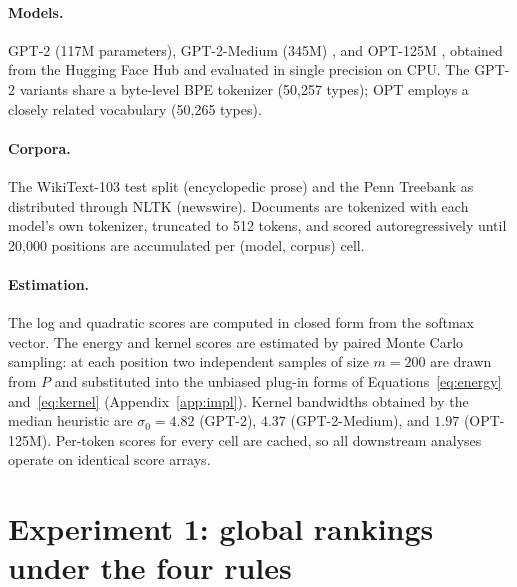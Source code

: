 \documentclass{article}
\begin{document}
\paragraph{Models.} GPT-2 (117M parameters), GPT-2-Medium (345M)
\citep{radford2019}, and OPT-125M \citep{zhang2022}, obtained from the Hugging Face Hub
and evaluated in single precision on CPU. The GPT-2 variants share a byte-level BPE
tokenizer (50{,}257 types); OPT employs a closely related vocabulary (50{,}265 types).

\paragraph{Corpora.} The WikiText-103 test split (encyclopedic prose) and the Penn
Treebank as distributed through NLTK (newswire). Documents are tokenized with each
model's own tokenizer, truncated to 512 tokens, and scored autoregressively until
20{,}000 positions are accumulated per (model, corpus) cell.

\paragraph{Estimation.} The log and quadratic scores are computed in closed form from the
softmax vector. The energy and kernel scores are estimated by paired Monte Carlo
sampling: at each position two independent samples of size $m = 200$ are drawn from $P$
and substituted into the unbiased plug-in forms of Equations~\eqref{eq:energy}
and~\eqref{eq:kernel} (Appendix~\ref{app:impl}). Kernel bandwidths obtained by the median
heuristic are $\sigma_0 = 4.82$ (GPT-2), $4.37$ (GPT-2-Medium), and $1.97$ (OPT-125M).
Per-token scores for every cell are cached, so all downstream analyses operate on
identical score arrays.

\section{Experiment 1: global rankings under the four rules}
\label{sec:exp1}
\end{document}
